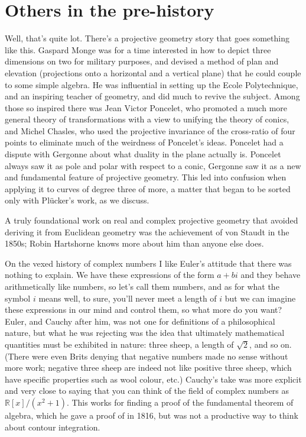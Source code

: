 \documentclass[11pt]{book}
\newcommand{\R}{\mathbb{R}}
\begin{document}
\section{Others in the pre-history}
Well, that's quite  lot. There's a projective geometry story that goes something like this. Gaspard Monge was for a time interested in how to depict three dimensions on two for military purposes, and devised a method of plan and elevation (projections onto a horizontal and a vertical plane) that he could couple to some simple algebra. He was influential in setting up the Ecole Polytechnique, and an inspiring teacher of geometry, and did much to revive the subject. Among those so inspired there was Jean Victor Poncelet, who promoted a much more general theory of transformations with a view to unifying the theory of conics, and Michel Chasles, who used the projective invariance of the cross-ratio of four points to eliminate much of the weirdness of Poncelet's ideas. Poncelet had a dispute with Gergonne about what duality in the plane actually is. Poncelet always saw it as pole and polar with respect to a conic, Gergonne saw it as a new and fundamental feature of projective geometry. This led into confusion when applying it to curves of degree three of more, a matter that began to be sorted only with Pl\"ucker's work, as we discuss.

A truly foundational work on real and complex projective geometry that avoided deriving it from Euclidean geometry was the achievement of von Staudt in the 1850s; Robin Hartshorne knows more about him than anyone else does.

On the vexed history of complex numbers I like Euler's attitude that there was nothing to explain. We have these expressions of the form $a+bi$ and they behave arithmetically like numbers, so let's call them numbers, and as for what the symbol $i$ means well, to sure, you'll never meet a length of $i$ but we can imagine these expressions in our mind and control them, so what more do you want? Euler, and Cauchy after him, was not one for definitions of a philosophical nature, but what he was rejecting was the idea that ultimately mathematical quantities must be exhibited in nature: three sheep, a length of $\sqrt{2}$, and so on. (There were even Brits denying that negative numbers made no sense without more work; negative three sheep are indeed not like positive three sheep, which have specific properties such as wool colour, etc.) Cauchy's take was more explicit and very close to saying that you can think of the field of complex numbers as $\R [x]/(x^2 + 1)$. This works for finding a proof of the fundamental theorem of algebra, which he gave a proof of in 1816, but was not a productive way to think about contour integration. 
\end{document}
